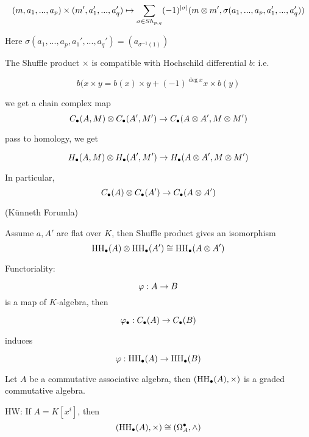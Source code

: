 $$(m,a_1,...,a_p)\times(m',a_1',...,a_q')\mapsto
\sum_{\sigma\in Sh_{p,q}}
  (-1)^{|\sigma|}
  (m\otimes m',\sigma(a_1,...,a_p,a_1',...,a_q'))
$$

Here $\sigma(a_1,...,a_p,a_1',...,a_q')=(a_{\sigma^{-1}(1)})$

\begin{prop}
The Shuffle product $\times$ is compatible with
Hochschild differential $b$: i.e.

$$b(x\times y=b(x)\times y+(-1)^{\deg x}x\times b(y)$$
\end{prop}



\begin{cor}
we get a chain complex map
$$C_{\bullet}(A,M)\otimes C_{\bullet}(A',M')
\to
C_{\bullet}(A\otimes A',M\otimes M')$$

pass to homology, we get

$$H_{\bullet}(A,M)\otimes H_{\bullet}(A',M')
\to
H_{\bullet}(A\otimes A',M\otimes M')$$

In particular,
$$C_{\bullet}(A)\otimes C_{\bullet}(A')\to C_{\bullet}(A\otimes A')$$
\end{cor}

\begin{thm}(K\"{u}nneth Forumla)

Assume $a,A'$ are flat over $K$,
then Shuffle product gives an isomorphism
$$\operatorname{HH}_{\bullet}(A)\otimes\operatorname{HH}_{\bullet}(A')\cong\operatorname{HH}_{\bullet}(A\otimes A')$$
\end{thm}


Functoriality:

$$\varphi:A\to B$$
is a map of $K$-algebra, then

$$\varphi_{\bullet}:C_{\bullet}(A)\to C_{\bullet}(B)$$

induces

$$\varphi:\operatorname{HH}_{\bullet}(A)\to \operatorname{HH}_{\bullet}(B)$$

\begin{cor}
Let $A$ be a commutative associative algebra, then
$(\operatorname{HH}_{\bullet}(A),\times)$ is a graded commutative algebra.
\end{cor}

HW: If $A=K[x^i]$, then
$$(\operatorname{HH}_{\bullet}(A),\times)\cong(\Omega_A^{\bullet},\wedge)$$


